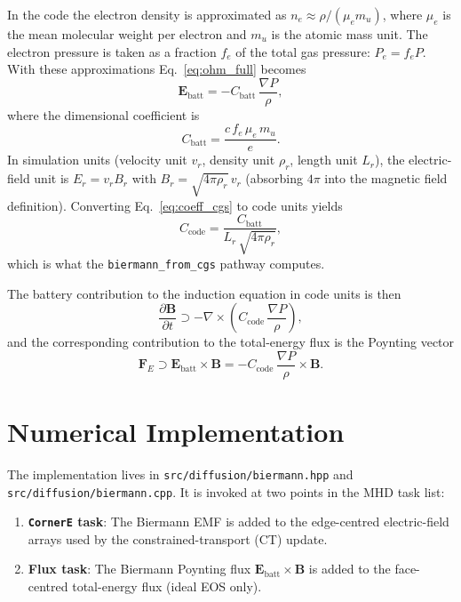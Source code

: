 \documentclass[11pt]{article}
\newcommand{\bv}[1]{\boldsymbol{#1}}
\newcommand{\grad}{\nabla}
\newcommand{\curl}{\nabla \times}
\newcommand{\Ebatt}{\bv{E}_\mathrm{batt}}
\begin{document}
In the code the electron density is approximated as
$n_e \approx \rho / (\mu_e m_u)$, where $\mu_e$ is the mean molecular weight
per electron and $m_u$ is the atomic mass unit.  The electron pressure is
taken as a fraction $f_e$ of the total gas pressure: $P_e = f_e P$.
With these approximations Eq.~\eqref{eq:ohm_full} becomes
\begin{equation}
  \Ebatt = -C_\mathrm{batt}\,\frac{\grad P}{\rho},
  \label{eq:ebatt}
\end{equation}
where the dimensional coefficient is
\begin{equation}
  C_\mathrm{batt} = \frac{c\, f_e\, \mu_e\, m_u}{e}.
  \label{eq:coeff_cgs}
\end{equation}
In simulation units (velocity unit $v_r$, density unit $\rho_r$, length unit
$L_r$), the electric-field unit is $E_r = v_r B_r$ with
$B_r = \sqrt{4\pi\rho_r}\,v_r$ (absorbing $4\pi$ into the magnetic field
definition).  Converting Eq.~\eqref{eq:coeff_cgs} to code units yields
\begin{equation}
  C_\mathrm{code}
    = \frac{C_\mathrm{batt}}{L_r\,\sqrt{4\pi\rho_r}},
  \label{eq:coeff_code}
\end{equation}
which is what the \texttt{biermann\_from\_cgs} pathway computes.

The battery contribution to the induction equation in code units is then
\begin{equation}
  \frac{\partial\bv{B}}{\partial t}
    \supset -\curl\!\left(C_\mathrm{code}\,\frac{\grad P}{\rho}\right),
  \label{eq:induction_code}
\end{equation}
and the corresponding contribution to the total-energy flux is the Poynting
vector
\begin{equation}
  \bv{F}_E \supset \Ebatt\times\bv{B}
           = -C_\mathrm{code}\,\frac{\grad P}{\rho}\times\bv{B}.
  \label{eq:poynting}
\end{equation}

\section{Numerical Implementation}
\label{sec:implementation}

The implementation lives in \texttt{src/diffusion/biermann.hpp} and
\texttt{src/diffusion/biermann.cpp}.  It is invoked at two points in the MHD
task list:
\begin{enumerate}
  \item \textbf{\texttt{CornerE} task}: The Biermann EMF is added to the
        edge-centred electric-field arrays used by the constrained-transport
        (CT) update.
  \item \textbf{Flux task}: The Biermann Poynting flux
        $\Ebatt\times\bv{B}$ is added to the face-centred total-energy
        flux (ideal EOS only).
\end{enumerate}
\end{document}
